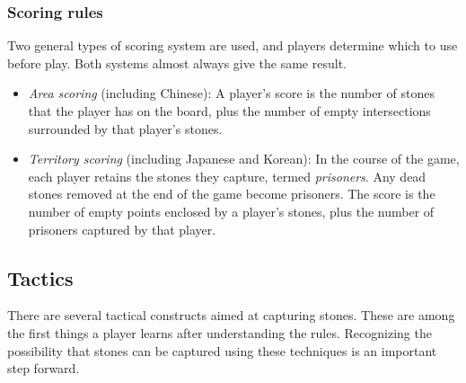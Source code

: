 \subsubsection{Scoring rules}
Two general types of scoring system are used, and players determine which to use before play. Both systems almost always give the same result.
\begin{itemize}
\item \emph{Area scoring} (including Chinese): A player's score is the number of stones that the player has on the board, plus the number of empty intersections surrounded by that player's stones.
\item \emph{Territory scoring} (including Japanese and Korean): In the course of the game, each player retains the stones they capture, termed \emph{prisoners}. Any dead stones removed at the end of the game become prisoners. The score is the number of empty points enclosed by a player's stones, plus the number of prisoners captured by that player.
\end{itemize}
\subsection{Tactics}
There are several tactical constructs aimed at capturing stones. These are among the first things a player learns after understanding the rules. Recognizing the possibility that stones can be captured using these techniques is an important step forward.

